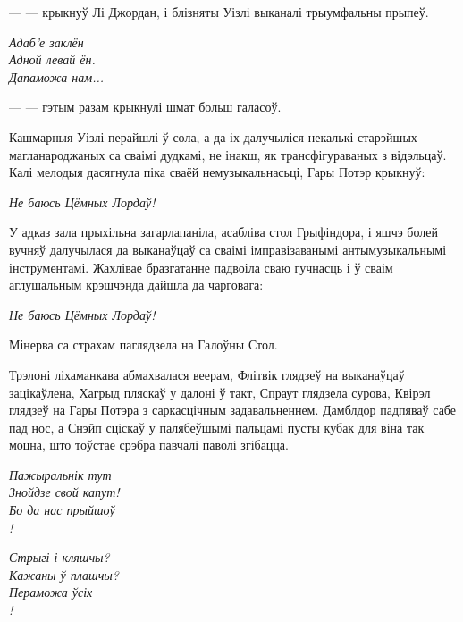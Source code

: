 
---  --- крыкнуў Лі Джордан, і блізняты Уізлі выканалі трыумфальны прыпеў.

\begin{center}
    \emph{Адаб'е заклён\\
    Адной левай ён.\\
    Дапаможа нам...}
\end{center}

---   --- гэтым разам крыкнулі шмат больш галасоў.

Кашмарныя Уізлі перайшлі ў сола, а да іх далучыліся некалькі старэйшых магланароджаных
са сваімі дудкамі, не інакш, як трансфігураваных з відэльцаў. Калі мелодыя дасягнула
піка сваёй немузыкальнасьці, Гары Потэр крыкнуў:
    
\begin{center}
    \emph{Не баюсь Цёмных Лордаў!}
\end{center}


У адказ зала прыхільна загарлапаніла, асабліва стол Грыфіндора, і яшчэ болей 
вучняў далучылася да выканаўцаў са сваімі імправізаванымі антымузыкальнымі інструментамі. 
Жахлівае бразгатанне падвоіла сваю гучнасць і ў сваім аглушальным крэшчэнда
дайшла да чарговага:

\begin{center}
    \emph{Не баюсь Цёмных Лордаў!}
\end{center}

Мінерва са страхам паглядзела на Галоўны Стол.

Трэлоні ліхаманкава абмахвалася веерам, Флітвік глядзеў на выканаўцаў зацікаўлена, 
Хагрыд пляскаў у далоні ў такт, Спраут глядзела сурова, Квірэл глядзеў на Гары Потэра 
з саркасцічным задавальненнем. Дамблдор падпяваў сабе пад нос, а Снэйп сціскаў у 
палябеўшымі пальцамі пусты кубак для віна так моцна, што тоўстае срэбра павчалі паволі згібацца.


\begin{center}
    \emph{Пажыральнік тут\\
    Знойдзе свой капут!\\
    Бо да нас прыйшоў\\
    !}
    
    \emph{Стрыгі і кляшчы?\\
    Кажаны ў плашчы?\\
    Пераможа ўсіх\\
    !}
\end{center}

